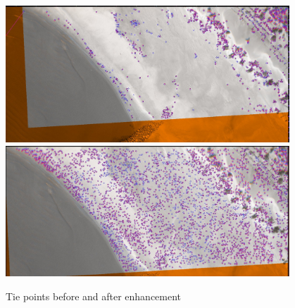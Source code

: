 \begin{figure}
\begin{center}
\includegraphics[width=0.95\textwidth]{FIGS/Tapioca-SFS/SIFT-STD.jpg}
\includegraphics[width=0.95\textwidth]{FIGS/Tapioca-SFS/SIFT-SFS.jpg}
\end{center}
\caption{Tie points before and after enhancement}
\label{FIG:SF:TieP}
\end{figure}

